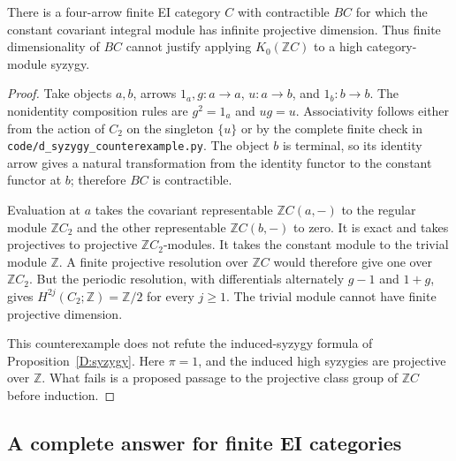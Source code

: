 \begin{proposition}
\label{D:syzygy-counterexample}
There is a four-arrow finite EI category $C$ with contractible $BC$ for
which the constant covariant integral module has infinite projective
dimension.  Thus finite dimensionality of $BC$ cannot justify applying
$K_0(\mathbb ZC)$ to a high category-module syzygy.
\end{proposition}
\begin{proof}
Take objects $a,b$, arrows
$1_a,g:a\to a$, $u:a\to b$, and $1_b:b\to b$.
The nonidentity composition rules are $g^2=1_a$ and $ug=u$.
Associativity follows either from the action of $C_2$ on the singleton
$\{u\}$ or by the complete finite check in
\texttt{code/d\_syzygy\_counterexample.py}.
The object $b$ is terminal, so its identity arrow gives a natural
transformation from the identity functor to the constant functor at
$b$; therefore $BC$ is contractible.

Evaluation at $a$ takes the covariant representable
$\mathbb ZC(a,-)$ to the regular module $\mathbb ZC_2$ and the other
representable $\mathbb ZC(b,-)$ to zero.  It is exact and takes
projectives to projective $\mathbb ZC_2$-modules.  It takes the constant
module to the trivial module $\mathbb Z$.  A finite projective
resolution over $\mathbb ZC$ would therefore give one over
$\mathbb ZC_2$.  But the periodic resolution, with differentials
alternately $g-1$ and $1+g$, gives
$H^{2j}(C_2;\mathbb Z)=\mathbb Z/2$ for every $j\geq1$.
The trivial module cannot have finite projective dimension.

This counterexample does not refute the induced-syzygy formula of
Proposition~\ref{D:syzygy}.  Here $\pi=1$, and the induced high syzygies
are projective over $\mathbb Z$.  What fails is a proposed passage to
the projective class group of $\mathbb ZC$ before induction.
\end{proof}

\subsection{A complete answer for finite EI categories}

